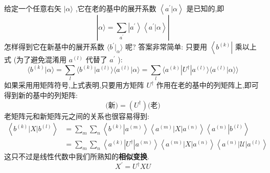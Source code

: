 	给定一个任意右矢 $|\alpha \rangle$ ,它在老的基中的展开系数 $\left\langle {{a}^{\prime } | \alpha }\right\rangle$ 是已知的,即
	\begin{equation}
		| {\alpha \rangle = \mathop{\sum }\limits_{{a}^{\prime }}\left| {a}^{\prime }\right\rangle \left\langle {{a}^{\prime } | \alpha }\right\rangle }|
	\end{equation}
	怎样得到它在新基中的展开系数 $\langle {{b}^{\prime }| }_{\alpha }\rangle$ 呢? 答案非常简单: 只要用 $\left\langle {b}^{\left( k\right) }\right|$ 乘以上式 (为了避免混淆用 ${a}^{\left( l\right) }$ 代替了 ${a}^{\prime }$ ):
	\begin{equation}
		\langle {{b}^{\left( k\right) } | \alpha }\rangle = \mathop{\sum }\limits_{l}\langle {{b}^{\left( k\right) }| {a}^{\left( l\right) }\rangle \langle {{a}^{\left( l\right) } | \alpha }\rangle = \mathop{\sum }\limits_{l}\langle {{a}^{\left( k\right) }| {U}^{ \dagger }| {a}^{\left( l\right) }}\rangle \langle {{a}^{\left( l\right) } | \alpha }\rangle}\rangle
	\end{equation}
	如果采用用矩阵符号,上式表明,只要用方矩阵 ${U}^{ \dagger }$ 作用在老的基中的列矩阵上,即可得到新的基中的列矩阵:
	\begin{equation}
		\text{(新)} = ( {U}^{ \dagger }) \text{(老)}
	\end{equation}
	老矩阵元和新矩阵元之间的关系也很容易得到:
	\begin{equation}
		\begin{aligned}
			\left\langle {{b}^{\left( k\right) }\left| X\right| {b}^{\left( l\right) }}\right\rangle &= \mathop{\sum }\limits_{m}\mathop{\sum }\limits_{n}\left\langle {{b}^{\left( k\right) }\left| {a}^{\left( m\right) }\right\rangle \left\langle {{a}^{\left( m\right) }\left| X\right| {a}^{\left( n\right) }}\right\rangle \left\langle {a}^{\left( n\right) }\right| {b}^{\left( l\right) }}\right\rangle\\
			&= \mathop{\sum }\limits_{m}\mathop{\sum }\limits_{n}\left\langle {{a}^{\left( k\right) }\left| {U}^{ \dagger }\right| {a}^{\left( m\right) }}\right\rangle \left\langle {{a}^{\left( m\right) }\left| X\right| {a}^{\left( n\right) }}\right\rangle \left\langle {{a}^{\left( n\right) }\left| \mathcal{U}\right| {a}^{\left( l\right) }}\right\rangle
		\end{aligned}
	\end{equation}
	这只不过是线性代数中我们所熟知的\textbf{相似变换}.
	\begin{equation}
		{X}^{\prime } = {U}^{ \dagger }{XU}
	\end{equation}
	
